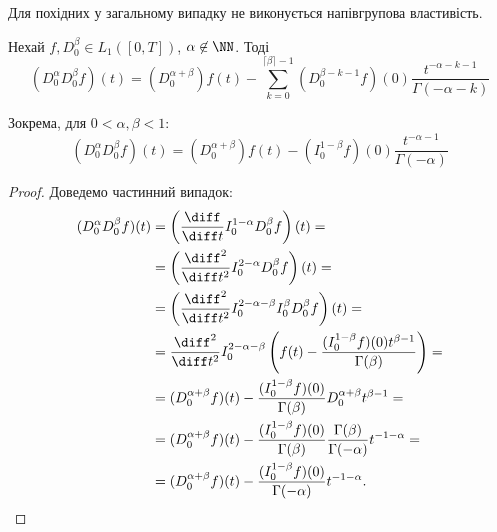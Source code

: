 \begin{proposition}
    Для похідних у загальному випадку не виконується напівгрупова властивість.
\end{proposition}
\begin{theorem}
    Нехай $f, D_0^\beta \in L_1([0, T])$, $\alpha \not\in \NN$. Тоді
    \begin{equation}
        (D_0^\alpha D_0^\beta f)(t) = (D_0^{\alpha + \beta}) f(t) - \sum_{k = 0}^{\lceil \beta \rceil - 1} (D_0^{\beta - k - 1} f)(0) \frac{t^{-\alpha - k - 1}}{\Gamma(-\alpha - k)}
    \end{equation}
\end{theorem}
\begin{example}
    Зокрема, для $0 < \alpha, \beta < 1$:
    \begin{equation}
        (D_0^\alpha D_0^\beta f)(t) = (D_0^{\alpha + \beta}) f(t) - (I_0^{1 - \beta} f)(0) \frac{t^{-\alpha - 1}}{\Gamma(-\alpha)}
    \end{equation}
\end{example}
\begin{proof}
    Доведемо частинний випадок:
    \begin{equation}
        \begin{aligned}
            (D_0^\alpha D_0^\beta f)(t)
            &= \left( \frac{\diff}{\diff t} I_0^{1 - \alpha} D_0^\beta f \right)(t) = \\
            &= \left( \frac{\diff^2}{\diff t^2} I_0^{2 - \alpha} D_0^\beta f \right)(t) = \\
            &= \left( \frac{\diff^2}{\diff t^2} I_0^{2 - \alpha - \beta} I_0^\beta D_0^\beta f \right)(t) = \\
            &= \frac{\diff^2}{\diff t^2} I_0^{2 - \alpha - \beta} \left( f(t) - \frac{(I_0^{1-\beta} f)(0) t^{\beta - 1}}{\Gamma(\beta)} \right) = \\
            &= (D_0^{\alpha + \beta} f)(t) - \frac{(I_0^{1-\beta} f)(0)}{\Gamma(\beta)} D_0^{\alpha+\beta} t^{\beta-1} = \\
            &= (D_0^{\alpha + \beta} f)(t) - \frac{(I_0^{1-\beta} f)(0)}{\Gamma(\beta)} \frac{\Gamma(\beta)}{\Gamma(-\alpha)} t^{-1-\alpha} = \\
            &= (D_0^{\alpha + \beta} f)(t) - \frac{(I_0^{1-\beta} f)(0)}{\Gamma(-\alpha)} t^{-1-\alpha}.
        \end{aligned}
    \end{equation}
\end{proof}
